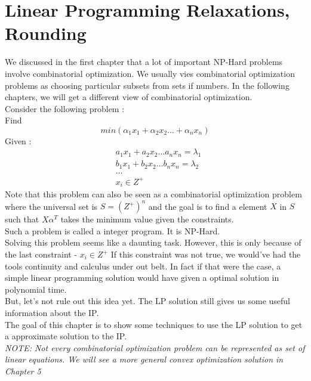 \documentclass[12pt]{report}
\begin{document}
 
\chapter{Linear Programming Relaxations, Rounding}
We discussed in the first chapter that a lot of important NP-Hard problems involve combinatorial optimization. We usually vies combinatorial optimization problems as choosing particular subsets from sets if numbers. In the following chapters, we will get a different view of combinatorial optimization.\\
Consider the following problem :\\
Find \begin{equation*}
min(\alpha_1x_1 + \alpha_2x_2 \ldots + \alpha_nx_n)
\end{equation*}
Given :
\begin{align*}
&a_1x_1 + a_2x_2 \ldots a_nx_n = \lambda_1 \\
&b_1x_1 + b_2x_2 \ldots b_nx_n = \lambda_2 \\
&\ldots\\
&x_i \in Z^+
\end{align*} 
Note that this problem can also be seen as a combinatorial optimization problem where the universal set is $S = (Z^+)^n$ and the goal is to find a element $X$ in $S$ such that $X\alpha^T$ takes the minimum value given the constraints. \\
Such a problem is called a integer program. It is NP-Hard.\\
Solving this problem seems like a daunting task. However, this is only because of the last constraint - $x_i \in Z^+$ If this constraint was not true, we would've had the tools continuity and calculus under out belt. In fact if that were the case, a simple linear programming solution would have given a optimal solution in polynomial time.\\
But, let's not rule out this idea yet. The LP solution still gives us some useful information about the IP. \\
The goal of this chapter is to show some techniques to use the LP solution to get a approximate solution to the IP.\\
\emph{NOTE: Not every combinatorial optimization problem can be represented as set of linear equations. We will see a more general convex optimization solution in Chapter 5}
\end{document}
